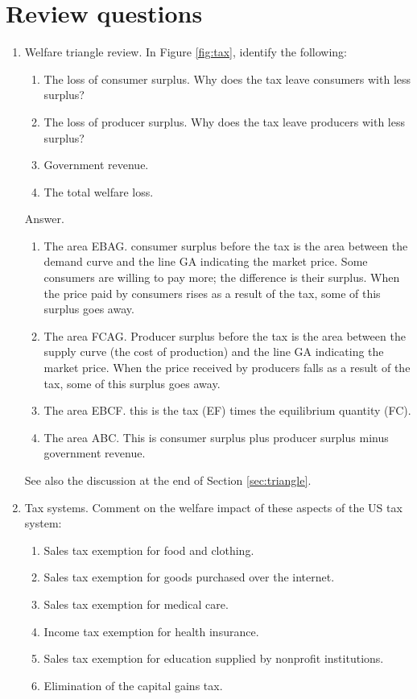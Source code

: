 \section*{Review questions}

\begin{enumerate}

\item  Welfare triangle review.
In Figure \ref{fig:tax}, identify the following:
\begin{enumerate}
\item The loss of consumer surplus.   Why does the tax leave consumers
with less surplus?
\item The loss of producer surplus.  Why does the tax leave producers
with less surplus?
\item Government revenue.
\item The total welfare loss.
\end{enumerate}

Answer.
\begin{enumerate}
\item The area EBAG.
consumer surplus before the tax is the area between the demand curve
and the line GA indicating the market price.
Some consumers are willing to pay more; the difference is their surplus.
When the price paid by consumers rises as a result of the tax, some of this surplus goes away.
\item The area FCAG.
Producer surplus before the tax is the area between the supply curve
(the cost of production) and the line GA indicating the market price.
When the price received by producers falls as a result of the tax, some of this surplus goes away.
\item The area EBCF.  this is the tax (EF) times the equilibrium quantity (FC).
\item The area ABC.  This is consumer surplus plus producer surplus
minus government revenue.
\end{enumerate}
See also the discussion at the end of Section \ref{sec:triangle}.

\item Tax systems.
Comment on the welfare impact of these aspects of the US tax system:
\begin{enumerate}
\item Sales tax exemption for food and clothing.
\item Sales tax exemption for goods purchased over the internet.
\item Sales tax exemption for medical care.
\item Income tax exemption for health insurance.
\item Sales tax exemption for education supplied by nonprofit institutions.
\item Elimination of the capital gains tax.
\end{enumerate}


\end{enumerate}
